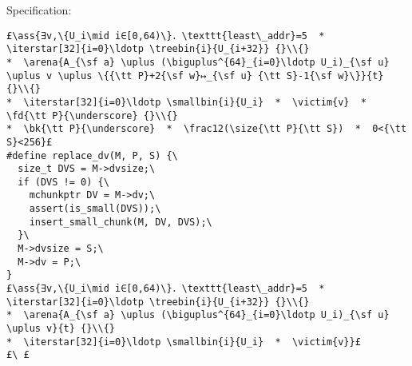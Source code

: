 \documentclass[svgnames,10pt,twoside]{report}
\makeatletter
\newcommand{\ml}[2][t]{\mbox{\mdseries\begin{tabular}[#1]{@{}L@{}}#2\end{tabular}}}
\newcommand{\ass}[1]{\ensuremath{{\color{blue}\left\{\ml[c]{#1}\right\}}}}
\newcommand{\iterstar}[2][]{\text{\LARGE $*$}^{#1}_{#2}}
\makeatother
\begin{document}
Specification:
\begin{lstlisting}
£\ass{∃v,\{U_i\mid i∈[0,64)\}．\texttt{least\_addr}=5  *  \iterstar[32]{i=0}\ldotp \treebin{i}{U_{i+32}} {}\\{}
*  \arena{A_{\sf a} \uplus (\biguplus^{64}_{i=0}\ldotp U_i)_{\sf u} \uplus v \uplus \{{\tt P}+2{\sf w}↦_{\sf u} {\tt S}-1{\sf w}\}}{t} {}\\{}
*  \iterstar[32]{i=0}\ldotp \smallbin{i}{U_i}  *  \victim{v}  *  \fd{\tt P}{\underscore} {}\\{} 
*  \bk{\tt P}{\underscore}  *  \frac12(\size{\tt P}{\tt S})  *  0<{\tt S}<256}£
#define replace_dv(M, P, S) {\
  size_t DVS = M->dvsize;\
  if (DVS != 0) {\
    mchunkptr DV = M->dv;\
    assert(is_small(DVS));\
    insert_small_chunk(M, DV, DVS);\
  }\
  M->dvsize = S;\
  M->dv = P;\
}
£\ass{∃v,\{U_i\mid i∈[0,64)\}．\texttt{least\_addr}=5  *  \iterstar[32]{i=0}\ldotp \treebin{i}{U_{i+32}} {}\\{}
*  \arena{A_{\sf a} \uplus (\biguplus^{64}_{i=0}\ldotp U_i)_{\sf u} \uplus v}{t} {}\\{}
*  \iterstar[32]{i=0}\ldotp \smallbin{i}{U_i}  *  \victim{v}}£
£\ £
\end{lstlisting}
\end{document}
